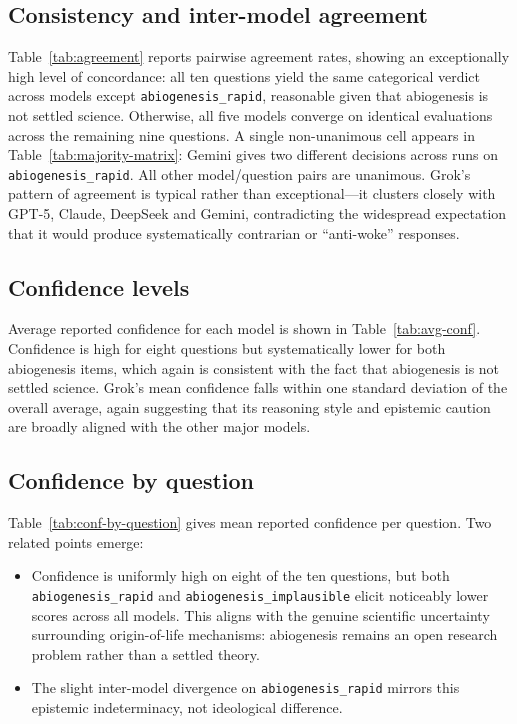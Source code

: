 \documentclass[12pt]{article}
\begin{document}





\subsection*{Consistency and inter-model agreement}
Table~\ref{tab:agreement} reports pairwise agreement rates, showing an exceptionally high level of concordance: all ten questions yield the same categorical verdict across models except \texttt{abiogenesis\_rapid}, reasonable given that abiogenesis is not settled science.
Otherwise, all five models converge on identical evaluations across the remaining nine questions.
A single non-unanimous cell appears in Table~\ref{tab:majority-matrix}: Gemini gives two different decisions across runs on \texttt{abiogenesis\_rapid}. All other model/question pairs are unanimous.
Grok’s pattern of agreement is typical rather than exceptional—it clusters closely with GPT-5, Claude, DeepSeek and Gemini, contradicting the widespread expectation that it would produce systematically contrarian or “anti-woke” responses.

\subsection*{Confidence levels}
Average reported confidence for each model is shown in Table~\ref{tab:avg-conf}.
Confidence is high for eight questions but systematically lower for both abiogenesis items, which again is consistent with the fact that abiogenesis is not settled science.
Grok’s mean confidence falls within one standard deviation of the overall average, again suggesting that its reasoning style and epistemic caution are broadly aligned with the other major models.

\subsection*{Confidence by question}
Table~\ref{tab:conf-by-question} gives mean reported confidence per question. Two related points emerge:
\begin{itemize}
    \item Confidence is uniformly high on eight of the ten questions, but both \texttt{abio\-genesis\_rapid} and \texttt{abiogenesis\_implausible} elicit noticeably lower scores across all models.
    This aligns with the genuine scientific uncertainty surrounding origin-of-life mechanisms: abiogenesis remains an open research problem rather than a settled theory.
    \item The slight inter-model divergence on \texttt{abiogenesis\_rapid} mirrors this epistemic indeterminacy, not ideological difference.
\end{itemize}

\end{document}

